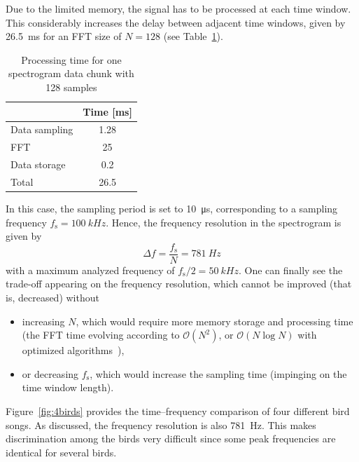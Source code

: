 \documentclass{EPL-master-thesis-covers-EN}
\newcommand{\te}[1]{\textrm{#1}}
\begin{document}
Due to the limited memory, the signal has to be processed at each time window. This considerably increases the delay between adjacent time windows, given by \SI{26.5}{ms} for an FFT size of $N = 128$ (see Table~\ref{tab:spec_data_proc}).

\begin{table}[H]
\centering
\begin{tabular}{lc}
\toprule
                     & Time [\si{ms}] \\ \midrule
 Data sampling       & 1.28           \\
 FFT                 & 25             \\
 Data storage        & 0.2            \\ \midrule
 Total               & 26.5           \\ \bottomrule
\end{tabular}
\caption{Processing time for one spectrogram data chunk with 128 samples}
\label{tab:spec_data_proc}
\end{table}

In this case, the sampling period is set to \SI{10}{\micro s}, corresponding to a sampling frequency $f_\te{s} = \SI{100}{kHz}$. Hence, the frequency resolution in the spectrogram is given by
\[
 \Delta f = \frac{f_\te{s}}{N} = \SI{781}{Hz}
\]
with a maximum analyzed frequency of $f_\te{s}/2 = \SI{50}{kHz}$. One can finally see the trade-off appearing on the frequency resolution, which cannot be improved (that is, decreased) without 
\begin{itemize}
 \item increasing $N$, which would require more memory storage and processing time (the FFT time evolving according to $\mathcal{O}(N^2)$, or $\mathcal{O}(N \log N)$ with optimized algorithms~\cite{QIU1999159}),
 \item or decreasing $f_\te{s}$, which would increase the sampling time (impinging on the time window length).
\end{itemize}

Figure~\ref{fig:4birds} provides the time--frequency comparison of four different bird songs. As discussed, the frequency resolution is also \SI{781}{Hz}. This makes discrimination among the birds very difficult since some peak frequencies are identical for several birds.
\end{document}
